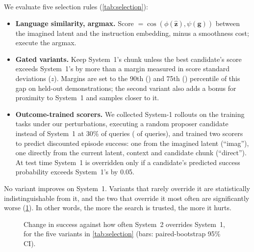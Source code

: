 \documentclass[11pt]{article}
\begin{document}
We evaluate five selection rules (\cref{tab:selection}):
\begin{itemize}[leftmargin=*,itemsep=2pt]
  \item \textbf{Language similarity, argmax.} Score $=\cos(\phi(\hat{\bm z}),\psi(\bm g))$ between the imagined latent and the instruction embedding, minus a smoothness cost; execute the argmax.
  \item \textbf{Gated variants.} Keep System~1's chunk unless the best candidate's score exceeds System~1's by more than a margin measured in score standard deviations ($z$). Margins are set to the 90th (\gapPninety) and 75th (\gapPseventyfive) percentile of this gap on held-out demonstrations; the second variant also adds a bonus for proximity to System~1 and samples closer to it.
  \item \textbf{Outcome-trained scorers.} We collected \rollEpisodes{} System-1 rollouts on the training tasks under our perturbations, executing a random proposer candidate instead of System~1 at 30\% of queries (\rollExplored{} of \rollQueries{} queries), and trained two scorers to predict discounted episode success: one from the imagined latent (``imag''), one directly from the current latent, context and candidate chunk (``direct''). At test time System~1 is overridden only if a candidate's predicted success probability exceeds System~1's by 0.05.
\end{itemize}



\noindent No variant improves on System~1. Variants that rarely override it are statistically indistinguishable from it, and the two that override it most often are significantly worse (\cref{fig:override}). In other words, the more the search is trusted, the more it hurts.

\begin{figure}[t]
\centering
{}
\caption{Change in success against how often System~2 overrides System~1, for the five variants in \cref{tab:selection} (bars: paired-bootstrap 95\% CI).}
\label{fig:override}
\end{figure}
\end{document}
